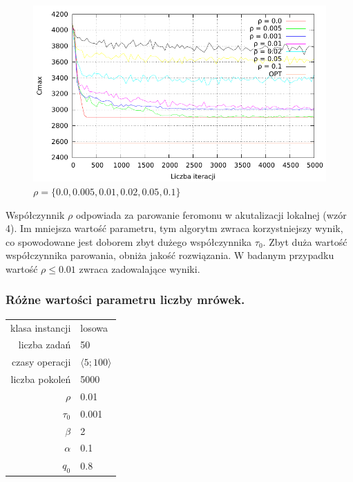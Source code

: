 \documentclass[10pt,a4paper]{article}
\begin{document}
\begin{figure}[h]
    \centering
    \includegraphics{./figures/inst_01_rnd_evapor_smooth.pdf}
    \caption{$ \rho = \{ 0.0, 0.005, 0.01, 0.02, 0.05, 0.1 \} $}
\end{figure}
\vspace{15mm}
Współczynnik $\rho$ odpowiada za parowanie feromonu w akutalizacji lokalnej (wzór 4).
Im mniejsza wartość parametru, tym algorytm zwraca korzystniejszy wynik, co spowodowane jest doborem zbyt dużego 
współczynnika $ \tau_0 $. Zbyt duża wartość współczynnika parowania, obniża jakość rozwiązania.
W badanym przypadku wartość $\rho \leq 0.01$ zwraca zadowalające wyniki.

\newpage
\subsubsection{Różne wartości parametru liczby mrówek.}
\vspace{6 mm}
\begin{center}
\begin{tabular}{|r|l|}
  \hline
  klasa instancji & losowa \\
  liczba zadań & 50 \\
  czasy operacji & $ \langle 5;100 \rangle $  \\
  liczba pokoleń & 5000 \\
  $ \rho $ & 0.01 \\
  $ \tau_0 $ & 0.001 \\
  $ \beta $ & 2 \\
  $ \alpha $ & 0.1 \\
  $ q_0 $ & 0.8 \\
  \hline
\end{tabular}
\end{center}
\end{document}
